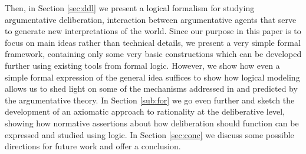 \documentclass[greybox]{svmult}
\begin{document}
Then, in Section \ref{sec:ddl} we present a logical formalism for studying argumentative deliberation, interaction between argumentative agents that serve to generate new interpretations of the world. Since our purpose in this paper is to focus on main ideas rather than technical details, we present a very simple formal framework, containing only some very basic constructions which can be developed further using existing tools from formal logic. However, we show how even a simple formal expression of the general idea suffices to show how logical modeling allows us to shed light on some of the mechanisms addressed in \cite{mercier} and predicted by the argumentative theory. In Section \ref{sub:for} we go even further and sketch the development of an axiomatic approach to rationality at the deliberative level, showing how normative assertions about how deliberation should function can be expressed and studied using logic. In Section \ref{sec:conc} we discuss some possible directions for future work and offer a conclusion.
%
%
\end{document}
